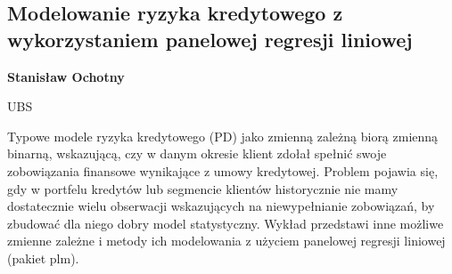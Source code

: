 \documentclass[\main/boa.tex]{subfiles}
\begin{document}
\subsection{ Modelowanie ryzyka kredytowego z wykorzystaniem panelowej regresji liniowej}

\begin{minipage}{0.915\textwidth}
	\centering
  {\bf {} Stanisław Ochotny}
\end{minipage}


\begin{affiliations}
\begin{minipage}{0.915\textwidth}
\centering
UBS \\[-2pt]
\end{minipage}
\end{affiliations}

\vskip 0.3cm

Typowe modele ryzyka kredytowego (PD) jako zmienną zależną biorą zmienną binarną, wskazującą, czy w danym okresie klient zdołał spełnić swoje zobowiązania finansowe wynikające z umowy kredytowej. Problem pojawia się, gdy w portfelu kredytów lub segmencie klientów historycznie nie mamy dostatecznie wielu obserwacji wskazujących na niewypełnianie zobowiązań, by zbudować dla niego dobry model statystyczny. Wykład przedstawi inne możliwe zmienne zależne i metody ich modelowania z użyciem panelowej regresji liniowej (pakiet plm).
\end{document}
